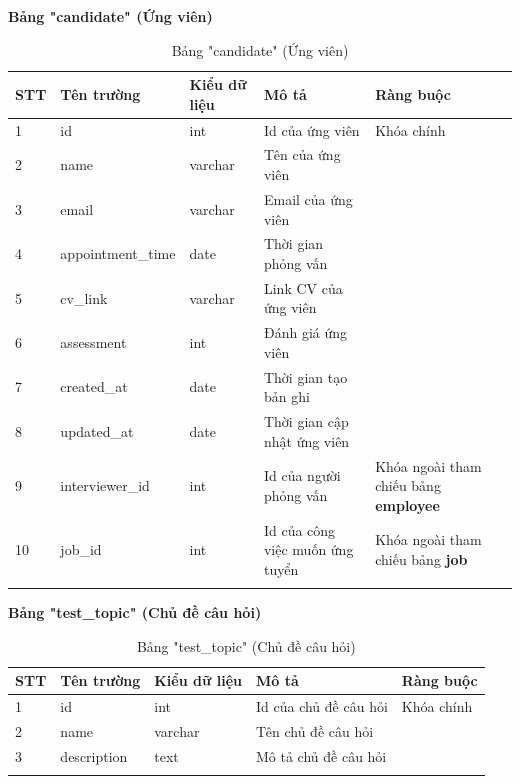 \documentclass[../DoAn.tex]{subfiles}
\begin{document}
\textbf{Bảng "candidate" (Ứng viên)}
\begin{longtable}{|p{}|p{}|p{}|p{}|p{}|}
\hline
\textbf{STT} & \textbf{Tên trường} & \textbf{Kiểu dữ liệu} & \textbf{Mô tả } & \textbf{Ràng buộc} \\ \hline
1   & id & int & Id của ứng viên & Khóa chính \\ \hline
2   & name & varchar & Tên của ứng viên & \\ \hline
3   & email & varchar & Email của ứng viên & \\ \hline
4   & appointment\_time & date & Thời gian phỏng vấn & \\ \hline
5   & cv\_link & varchar & Link CV của ứng viên & \\ \hline
6   & assessment & int & Đánh giá ứng viên & \\ \hline
7   & created\_at & date & Thời gian tạo bản ghi & \\ \hline
8   & updated\_at & date & Thời gian cập nhật ứng viên & \\ \hline
9   & interviewer\_id & int & Id của người phỏng vấn & Khóa ngoài tham chiếu bảng \textbf{employee} \\ \hline
10   & job\_id & int & Id của công việc muốn ứng tuyển & Khóa ngoài tham chiếu bảng \textbf{job} \\ \hline
\caption{Bảng "candidate" (Ứng viên)}
\end{longtable}

\textbf{Bảng "test\_topic" (Chủ đề câu hỏi)}
\begin{longtable}{|p{}|p{}|p{}|p{}|p{}|}
\hline
\textbf{STT} & \textbf{Tên trường} & \textbf{Kiểu dữ liệu} & \textbf{Mô tả } & \textbf{Ràng buộc} \\ \hline
1   & id & int & Id của chủ đề câu hỏi & Khóa chính \\ \hline
2   & name & varchar & Tên chủ đề câu hỏi & \\ \hline
3   & description & text & Mô tả chủ đề câu hỏi & \\ \hline
\caption{Bảng "test\_topic" (Chủ đề câu hỏi)}
\end{longtable}
\end{document}
